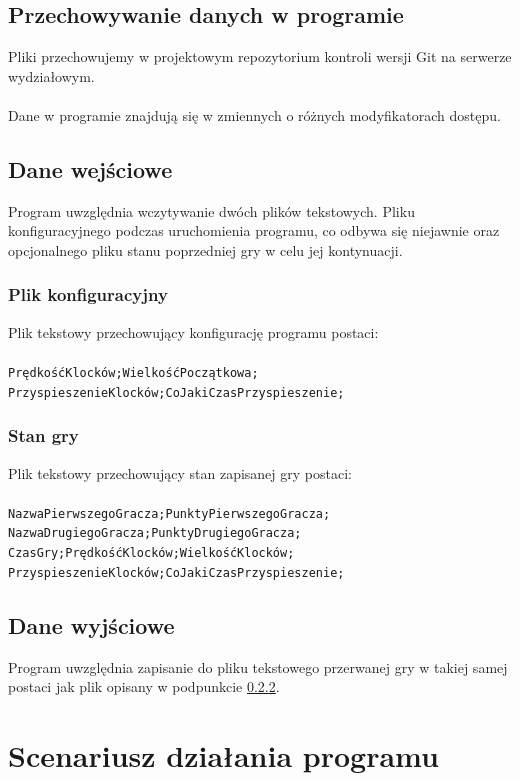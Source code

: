 \documentclass[a4paper]{article}
\newcommand{\prog}{\texttt}
\begin{document}
\subsection{Przechowywanie danych w programie}
Pliki przechowujemy w projektowym repozytorium kontroli wersji Git na serwerze wydziałowym.\\ \\
Dane w programie znajdują się w zmiennych o różnych modyfikatorach dostępu.

\subsection{Dane wejściowe}
Program uwzględnia wczytywanie dwóch plików tekstowych. Pliku konfiguracyjnego podczas uruchomienia programu, co odbywa się niejawnie oraz opcjonalnego pliku stanu poprzedniej gry w celu jej kontynuacji.

\subsubsection{Plik konfiguracyjny}
Plik tekstowy przechowujący konfigurację programu postaci:\\ \\
\prog{PrędkośćKlocków;WielkośćPoczątkowa;\\PrzyspieszenieKlocków;CoJakiCzasPrzyspieszenie;}

\subsubsection{Stan gry}\label{stan}
Plik tekstowy przechowujący stan zapisanej gry postaci:\\ \\
\prog{NazwaPierwszegoGracza;PunktyPierwszegoGracza;\\NazwaDrugiegoGracza;PunktyDrugiegoGracza;\\CzasGry;PrędkośćKlocków;WielkośćKlocków;\\PrzyspieszenieKlocków;CoJakiCzasPrzyspieszenie;}

\subsection{Dane wyjściowe}
Program uwzględnia zapisanie do pliku tekstowego przerwanej gry w takiej samej postaci jak plik opisany w podpunkcie \ref{stan}.

\section{Scenariusz działania programu}
\end{document}
